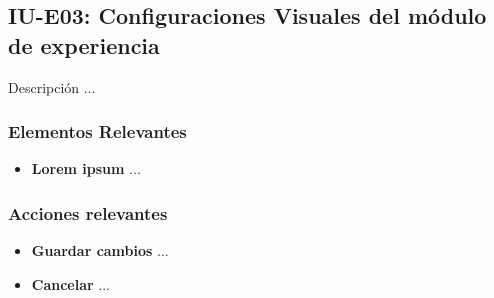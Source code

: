 
\subsection{IU-E03: Configuraciones Visuales del módulo de experiencia}

 Descripción ...


\subsubsection{Elementos Relevantes}

    \begin{itemize}
    \item {\bf Lorem ipsum}
        ...
    \end{itemize}

\subsubsection{Acciones relevantes}

    \begin{itemize}
    \item {\bf Guardar cambios}
        ...

    \item {\bf Cancelar}
        ...
    \end{itemize}

\clearpage
